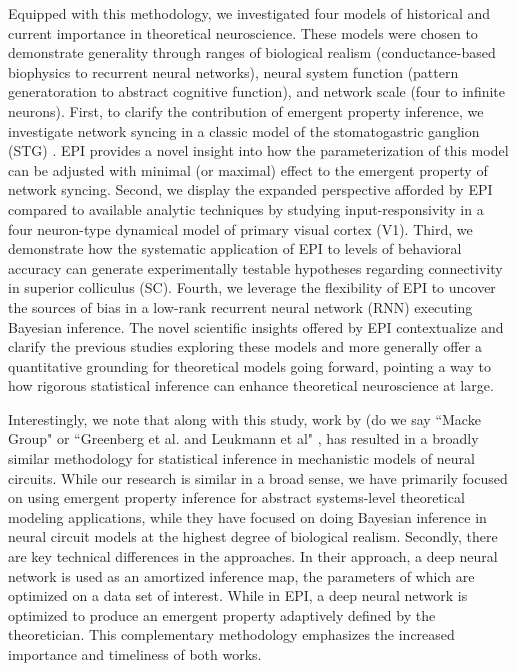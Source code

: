 \documentclass[11pt]{article}
\begin{document}
Equipped with this methodology, we investigated four models of historical and current importance in theoretical neuroscience.
These models were chosen to demonstrate generality through ranges of biological realism (conductance-based biophysics to recurrent neural networks), neural system function (pattern generatoration to abstract cognitive function), and network scale (four to infinite neurons).
First, to clarify the contribution of emergent property inference, we investigate network syncing in a classic model of the stomatogastric ganglion (STG) \cite{gutierrez2013multiple}.  
EPI provides a novel insight into how the parameterization of this model can be adjusted with minimal (or maximal) effect to the emergent property of network syncing.   
Second, we display the expanded perspective afforded by EPI compared to available analytic techniques by studying input-responsivity in a four neuron-type dynamical model of primary visual cortex (V1).  
Third, we demonstrate how the systematic application of EPI to levels of behavioral accuracy can generate experimentally testable hypotheses regarding connectivity in superior colliculus (SC).  
Fourth, we leverage the flexibility of EPI to uncover the sources of bias in a low-rank recurrent neural network (RNN) executing Bayesian inference.  
The novel scientific insights offered by EPI contextualize and clarify the previous studies exploring these models and more generally offer a quantitative grounding for theoretical models  going forward, pointing a way to how rigorous statistical inference can enhance theoretical neuroscience at large.





Interestingly, we note that along with this study, work by (do we say ``Macke Group" or ``Greenberg et al. and Leukmann et al" \cite{lueckmann2017flexible, greenberg2019automatic},  has resulted in a broadly similar methodology for statistical inference in mechanistic models of neural circuits.
While our research is similar in a broad sense, we have primarily focused on using emergent property inference for abstract systems-level theoretical modeling applications, while they have focused on doing Bayesian inference in neural circuit models at the highest degree of biological realism.
Secondly, there are key technical differences in the approaches.  In their approach, a deep neural network is used as an amortized inference map, the parameters of which are optimized on a data set of interest.  
While in EPI, a deep neural network is optimized to produce an emergent property adaptively defined by the theoretician. 
This complementary methodology emphasizes the increased importance and timeliness of both works. 
\end{document}
